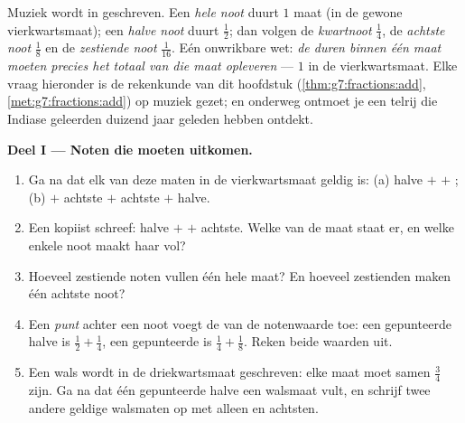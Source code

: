 \begin{problem}
\label{pb:g7:fractions:1}
Muziek wordt in  geschreven. Een \emph{hele noot} duurt $1$ maat (in de
gewone vierkwartsmaat); een \emph{halve noot} duurt $\frac12$; dan volgen de
\emph{kwartnoot} $\frac14$, de \emph{achtste noot} $\frac18$ en de
\emph{zestiende noot} $\frac{1}{16}$. Eén onwrikbare wet: \emph{de duren binnen
één maat moeten precies het totaal van die maat opleveren} --- $1$ in de
vierkwartsmaat. Elke vraag hieronder is de rekenkunde van dit hoofdstuk
(\cref{thm:g7:fractions:add}, \cref{met:g7:fractions:add}) op muziek gezet; en
onderweg ontmoet je een telrij die Indiase geleerden duizend jaar geleden hebben
ontdekt.

\medskip
\noindent\textbf{Deel I --- Noten die moeten uitkomen.}
\begin{enumerate}
  \item Ga na dat elk van deze maten in de vierkwartsmaat geldig is: (a) halve
        $+$  $+$ ; (b)  $+$ achtste $+$ achtste $+$ halve.
  \item Een kopiist schreef: halve $+$  $+$ achtste. Welke  van de
        maat staat er, en welke enkele noot maakt haar vol?
  \item Hoeveel zestiende noten vullen één hele maat? En hoeveel zestienden maken
        één achtste noot?
  \item Een \emph{punt} achter een noot voegt de  van de notenwaarde toe: een
        gepunteerde halve is $\frac12 + \frac14$, een gepunteerde  is
        $\frac14 + \frac18$. Reken beide waarden uit.
  \item Een wals wordt in de driekwartsmaat geschreven: elke maat moet samen
        $\frac34$ zijn. Ga na dat één gepunteerde halve een walsmaat vult, en
        schrijf twee andere geldige walsmaten op met alleen  en achtsten.
\end{enumerate}


\end{problem}
